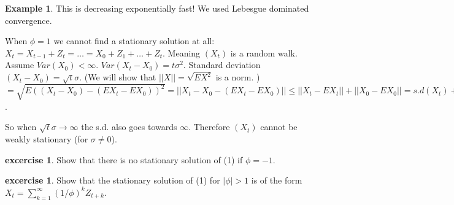 \documentclass[12pt,a4paper]{amsart}
\theoremstyle{definition} %
\newtheorem{example}[defn]{Example}
\newtheorem{excercise}[defn]{excercise}
\theoremstyle{plain} %
\begin{document}
\begin{example}
This is decreasing exponentially fast! We used Lebesgue dominated convergence.


When $\phi = 1$ we cannot find a stationary solution at all:
$X_t = X_{t-1} + Z_t = \dots = X_0 + Z_1 + \dots + Z_t$. Meaning $(X_t)$ is a random walk. 
Assume $Var(X_0) < \infty$. $Var(X_t - X_0) = t \sigma^2$. 
Standard deviation $(X_t - X_0) = \sqrt{t} \sigma$.
(We will show that $|| X || = \sqrt{EX^2}$ is a norm. )
$= \sqrt{E((X_t - X_0) - (EX_t - EX_0))^2} = || X_t - X_0 - (EX_t - EX_0) || \leq || X_t - EX_t || + || X_0 - EX_0|| = s.d(X_t) + s.d(X_0) \in [0, \infty]$.

So when $\sqrt{t}\sigma \rightarrow \infty$ the s.d. also goes towards $\infty$. Therefore $(X_t)$ cannot be weakly stationary (for $\sigma \neq 0$). 
\end{example}



\begin{excercise}
Show that there is no stationary solution of 
(1) if $\phi = -1$.
\end{excercise}

\begin{excercise}
Show that the stationary solution of 
(1) for $|\phi| > 1 $ is of the form 
$X_t = \sum_{k = 1}^\infty (1/\phi)^k Z_{t + k}$.
\end{excercise}
\end{document}

